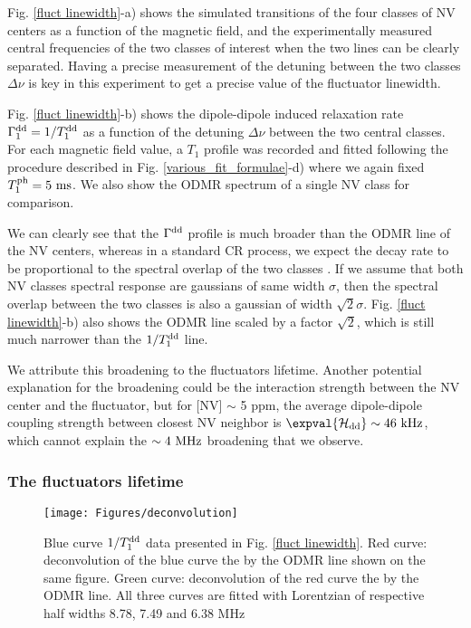 \documentclass[a4paper,11pt]{report}
\begin{document}
Fig. \ref{fluct linewidth}-a) shows the simulated transitions of the four classes of NV centers as a function of the magnetic field, and the experimentally measured central frequencies of the two classes of interest when the two lines can be clearly separated. Having a precise measurement of the detuning between the two classes $\Delta \nu$ is key in this experiment to get a precise value of the fluctuator linewidth.

Fig. \ref{fluct linewidth}-b) shows the dipole-dipole induced relaxation rate $\Gamma_1^{\rm dd}=1/T_1^{\rm dd}$ as a function of the detuning $\Delta \nu$ between the two central classes. For each magnetic field value, a $T_1$ profile was recorded and fitted following the procedure described in Fig. \ref{various_fit_formulae}-d) where we again fixed $T_1^{\rm ph}=5\ \rm ms$. We also show the ODMR spectrum of a single NV class for comparison.

We can clearly see that the $\Gamma^{\rm dd}$ profile is much broader than the ODMR line of the NV centers, whereas in a standard CR process, we expect the decay rate to be proportional to the spectral overlap of the two classes \citep{hall2016detection}. If we assume that both NV classes spectral response are gaussians of same width $\sigma$, then the spectral overlap between the two classes is also a gaussian of width $\sqrt{2} \sigma$. Fig. \ref{fluct linewidth}-b) also shows the ODMR line scaled by a factor $\sqrt{2}$, which is still much narrower than the $1/T_1^{\rm dd}$ line.

We attribute this broadening to the fluctuators lifetime. Another potential explanation for the broadening could be the interaction strength between the NV center and the fluctuator, but for [NV] $\sim$ 5 ppm, the average dipole-dipole coupling strength between closest NV neighbor is $\expval{\mathcal{H}_{\rm dd}} \sim 46\ \rm kHz$, which cannot explain the $\sim 4\ \rm MHz$ broadening that we observe.

\subsubsection{The fluctuators lifetime}
\begin{figure}[h]
\centering
\texttt{[image: Figures/deconvolution]}
\caption{Blue curve $1/T_1^{\rm dd}$ data presented in Fig. \ref{fluct linewidth}. Red curve: deconvolution of the blue curve the  by the ODMR line shown on the same figure. Green curve: deconvolution of the red curve the  by the ODMR line. All three curves are fitted with Lorentzian of respective half widths 8.78, 7.49 and 6.38 MHz}
\label{deconvolution}
\end{figure}
\end{document}
